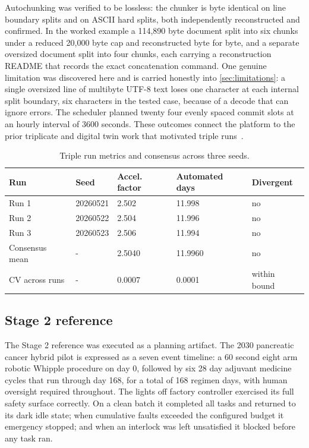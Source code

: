 Autochunking was verified to be lossless: the chunker is byte
identical on line boundary splits and on ASCII hard splits, both independently
reconstructed and confirmed. In the worked example a 114{,}890 byte document
split into six chunks under a reduced 20{,}000 byte cap and reconstructed byte for
byte, and a separate oversized document split into four chunks, each carrying a
reconstruction README that records the exact concatenation command. One genuine limitation was discovered here and is
carried honestly into \autoref{sec:limitations}: a single oversized line of
multibyte UTF-8 text loses one character at each internal split boundary, six
characters in the tested case, because of a decode that can ignore errors. The scheduler planned twenty four evenly spaced commit slots at
an hourly interval of 3600 seconds. These outcomes connect the platform to the
prior triplicate and digital twin work that motivated triple runs~\cite{kawchak2025pdactwin}.

\begin{table}[H]
\caption{Triple run metrics and consensus across three seeds.}
\label{tab:results_triplerun}
\centering
\begin{tabularx}{\textwidth}{L{2.8cm} C{2.8cm} C{3.0cm} C{3.0cm} >{\raggedright\arraybackslash}X}
\toprule
\textbf{Run} & \textbf{Seed} & \textbf{Accel. factor} & \textbf{Automated days} & \textbf{Divergent} \\
\midrule
  Run 1          & 20260521 & 2.502  & 11.998  & no \\
  Run 2          & 20260522 & 2.504  & 11.996  & no \\
  Run 3          & 20260523 & 2.506  & 11.994  & no \\
  \midrule
  Consensus mean & -        & 2.5040 & 11.9960 & no \\
  CV across runs & -        & 0.0007 & 0.0001  & within bound \\
\bottomrule
\end{tabularx}
\end{table}

\subsection{Stage 2 reference}

The Stage 2 reference was executed as a planning artifact. The 2030 pancreatic
cancer hybrid pilot is expressed as a seven event timeline: a 60 second eight arm
robotic Whipple procedure on day 0, followed by six 28 day adjuvant medicine
cycles that run through day 168, for a total of 168 regimen days, with human
oversight required throughout. The lights off factory controller exercised its
full safety surface correctly. On a clean batch it completed all tasks and
returned to its dark idle state; when cumulative faults exceeded the configured
budget it emergency stopped; and when an interlock was left unsatisfied it blocked
before any task ran. 

